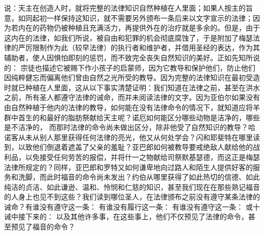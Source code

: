 \par

说：天主在创造人时，就将完整的法律知识自然种植在人里面；如果人按主的旨意，如同起初一样保持这知识，就不需要另外颁布一条后来以文字宣示的法律；因为若内在的药物仍被种植且充满活力，再提供外在的治疗就是多余的。但是，由于这内在的法律，如我们所说，被自由和犯罪的机会彻底腐蚀了，于是附加了梅瑟法律的严厉限制作为此（较早法律）的执行者和维护者，并借用圣经的表达，作为其辅助者，使人因惧怕即刻的惩罚，而不致完全丧失自然知识的美好。正如先知所说的： 宗徒也描述它被赐下作小孩子的启蒙师，因为它教导和保护他们，防止他们因纯粹健忘而偏离他们曾由自然之光所受的教导。因为完整的法律知识在最初受造时就已种植在人里面，这从以下事实清楚证明：我们知道在法律之前，甚至在洪水之前，所有圣人都遵守法律的诫命，而并未阅读法律的文字。因为\newline{}\newline{}亚伯尔如果没有由自然种植于他内的法律的教导，如何能在没有法律命令的情况下，就知道应将羊群中首生的和最好的脂肪祭献给天主呢？\newline{}\newline{}诺厄如何能区分哪些动物是洁净的，哪些是不洁净的， 而那时法律的命令尚未做出区分，除非他受了自然知识的教导？\newline{}\newline{}哈诺客从未从别人那里获得任何法律的亮光，他又从何处学会？\newline{}\newline{}闪和耶斐特在哪里读到，以致他们倒退着遮盖了父亲的羞耻？\newline{}\newline{}亚巴郎如何被教导要戒绝敌人献给他的战利品，以免接受任何劳苦的报偿，并将什一之物献给司祭默基瑟德，而这正是梅瑟法律所规定的？\newline{}\newline{}同样，亚巴郎和罗特又如何谦卑地向过路人和陌生人提供好客的服务和洗脚，而此时福音的命令尚未发出？\newline{}\newline{}约伯从哪里获得了如此热切的信德、如此纯洁的贞洁、如此谦逊、温和、怜悯和仁慈的知识，甚至我们现在在那些熟记福音的人身上也见不到这些？\newline{}\newline{}我们读到哪位圣人，在法律颁布之前没有遵守某条法律的诫命？有谁没有遵守这一条：  有谁没有履行这一条： 有谁没有遵守这一条： 或十诫中接下来的：  以及其他许多事，在这些事上，他们不仅预见了法律的命令，甚至预见了福音的命令？\par

